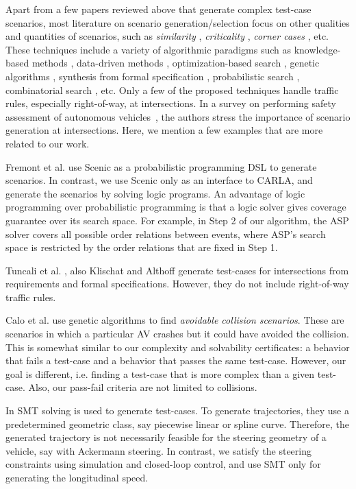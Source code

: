 Apart from a few papers reviewed above that generate complex test-case scenarios, most literature on scenario generation/selection focus on other qualities and quantities of scenarios, such as \emph{similarity} \cite{Harder.2021}, \emph{criticality} \cite{Klischat.2019,Zhong.2021}, \emph{corner cases} \cite{OKelly.2018}, etc.
%
These techniques include a variety of algorithmic paradigms such as  knowledge-based methods \cite{Li.2020}, data-driven methods \cite{OKelly.2018}, optimization-based search \cite{Klischat.2020,Feng_Methodology.2020,Feng_CaseStudies.2020}, genetic algorithms \cite{Klischat.2019,Calo.2020,Zhong.2021}, synthesis from formal specification \cite{Klischat.2020,Tuncali.2019}, probabilistic search \cite{Fremont_testing.2020,Tuncali.2016}, combinatorial search \cite{Tuncali.2019,Gao.2019,Xia.2018}, etc.
%
Only a few of the proposed techniques handle traffic rules, especially right-of-way, at intersections.
%
In a survey on performing safety assessment of autonomous vehicles~\cite{Riedmaier.2020}, the authors stress the importance of scenario generation at intersections.
%
Here, we mention a few examples that are more related to our work.


Fremont et al. \cite{Fremont_testing.2020} use Scenic as a probabilistic programming DSL to generate scenarios.
%
In contrast, we use Scenic only as an interface to CARLA, and generate the scenarios by solving logic programs.
%
An advantage of logic programming over probabilistic programming is that a logic solver gives coverage guarantee over its search space.
%
For example, in Step 2 of our algorithm, the ASP solver covers all possible order relations between events, where ASP's search space is restricted by the order relations that are fixed in Step 1.


Tuncali et al. \cite{Tuncali.2019}, also Klischat and Althoff \cite{Klischat.2020} generate test-cases for intersections from requirements and formal specifications.
%
However, they do not include right-of-way traffic rules.


Calo et al. \cite{Calo.2020} use genetic algorithms to find \emph{avoidable collision scenarios}.
%
These are scenarios in which a particular AV crashes but it could have avoided the collision.
%
This is somewhat similar to our complexity and solvability certificates: a behavior that fails a test-case and a behavior that passes the same test-case.
%
However, our goal is different, i.e. finding a test-case that is more complex than a given test-case.
%
Also, our pass-fail criteria are not limited to collisions.


In \cite{kim2019test} SMT solving is used to generate test-cases.
%
To generate trajectories, they use a predetermined geometric class, say piecewise linear or spline curve. 
%
Therefore, the generated trajectory is not necessarily feasible for the steering geometry of a vehicle, say with Ackermann steering.
%
In contrast, we satisfy the steering constraints using simulation and closed-loop control, and use SMT only for generating the longitudinal speed.
